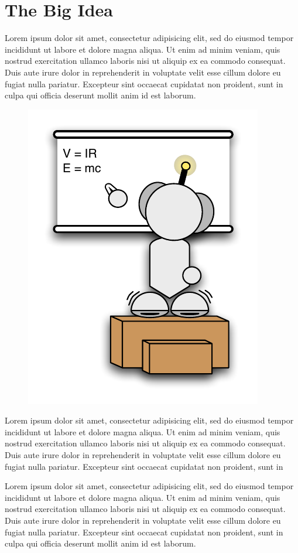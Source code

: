 \section{The Big Idea}

Lorem ipsum dolor sit amet, consectetur adipisicing elit, sed do
eiusmod tempor incididunt ut labore et dolore magna aliqua. Ut enim
ad minim veniam, quis nostrud exercitation ullamco laboris nisi ut
aliquip ex ea commodo consequat. Duis aute irure dolor in
reprehenderit in voluptate velit esse cillum dolore eu fugiat nulla
pariatur. Excepteur sint occaecat cupidatat non proident, sunt in
culpa qui officia deserunt mollit anim id est laborum.

 \begin{figure}
		\includegraphics[width=0.35\columnwidth]{diagrams/robot_whiteboard.pdf}
 \end{figure}

Lorem ipsum dolor sit amet, consectetur adipisicing elit, sed do
eiusmod tempor incididunt ut labore et dolore magna aliqua. Ut enim
ad minim veniam, quis nostrud exercitation ullamco laboris nisi ut
aliquip ex ea commodo consequat. Duis aute irure dolor in
reprehenderit in voluptate velit esse cillum dolore eu fugiat nulla
pariatur. Excepteur sint occaecat cupidatat non proident, sunt in

Lorem ipsum dolor sit amet, consectetur adipisicing elit, sed do
eiusmod tempor incididunt ut labore et dolore magna aliqua. Ut enim
ad minim veniam, quis nostrud exercitation ullamco laboris nisi ut
aliquip ex ea commodo consequat. Duis aute irure dolor in
reprehenderit in voluptate velit esse cillum dolore eu fugiat nulla
pariatur. Excepteur sint occaecat cupidatat non proident, sunt in
culpa qui officia deserunt mollit anim id est laborum.


